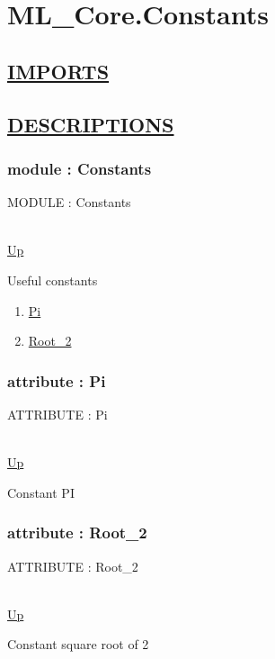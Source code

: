 \chapter*{ML\_Core.Constants}
\hypertarget{ML_Core.Constants}{}

\section*{\underline{IMPORTS}}

\section*{\underline{DESCRIPTIONS}}
\subsection*{module : Constants}
\hypertarget{ecldoc:ML_Core.Constants}{MODULE : Constants} \\
\hyperlink{ecldoc:}{Up} \\
\par
Useful constants \\
\begin{enumerate}
\item \hyperlink{ecldoc:ml_core.constants.pi}{Pi}
\item \hyperlink{ecldoc:ml_core.constants.root_2}{Root\_2}
\end{enumerate}
\subsection*{attribute : Pi}
\hypertarget{ecldoc:ml_core.constants.pi}{ATTRIBUTE : Pi} \\
\hyperlink{ecldoc:ML_Core.Constants}{Up} \\
\par
Constant PI \\
\subsection*{attribute : Root\_2}
\hypertarget{ecldoc:ml_core.constants.root_2}{ATTRIBUTE : Root\_2} \\
\hyperlink{ecldoc:ML_Core.Constants}{Up} \\
\par
Constant square root of 2 \\

